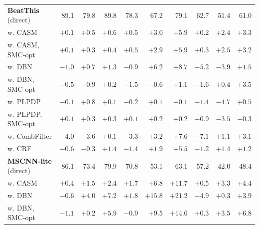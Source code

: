 \documentclass{article}
\begin{document}
\begin{table}[t]
{\begin{tabular}{l|rrr|rrr|rrr}
\textbf{BeatThis} (direct) \cite{foscarin2024beat}
& 89.1 & 79.8 & 89.8
& 78.3 & 67.2 & 79.1
& 62.7 & 51.4 & 61.0 \\
\rowcolor{gray!10}
\quad w. CASM
& $\mathbf{+0.1}$ & $+0.5$ & $+0.6$
& $\mathbf{+0.5}$ & $+3.0$ & $+5.9$
& $+0.2$ & $+2.4$ & $+3.3$ \\
\quad w. CASM, SMC-opt
& $\mathbf{+0.1}$ & $+0.3$ & $+0.4$
& $\mathbf{+0.5}$ & $+2.9$ & $+5.9$
& $\mathbf{+0.3}$ & $\mathbf{+2.5}$ & $+3.2$ \\
\rowcolor{gray!10}
\quad w. DBN \cite{krebs2015dbn}
& $-1.0$ & $+0.7$ & $+1.3$
& $-0.9$ & $\mathbf{+6.2}$ & $\mathbf{+8.7}$
& $-5.2$ & $-3.9$ & $+1.5$ \\
\quad w. DBN, SMC-opt
& $-0.5$ & $-0.9$ & $+0.2$
& $-1.5$ & $-0.6$ & $+1.1$
& $-1.6$ & $+0.4$ & $\mathbf{+3.5}$ \\
\rowcolor{gray!10}
\quad w. PLPDP \cite{chiu2023localperiodicity}
& $-0.1$ & $\mathbf{+0.8}$ & $+0.1$
& $-0.2$ & $+0.1$ & $-0.1$
& $-1.4$ & $-4.7$ & $+0.5$ \\
\quad w. PLPDP, SMC-opt
& $\mathbf{+0.1}$ & $+0.3$ & $+0.3$
& $+0.1$ & $+0.2$ & $+0.2$
& $-0.9$ & $-3.5$ & $-0.3$ \\
\rowcolor{gray!10}
\quad w. CombFilter \cite{bock2015combfilter}
& $-4.0$ & $-3.6$ & $+0.1$
& $-3.3$ & $+3.2$ & $+7.6$
& $-7.1$ & $+1.1$ & $+3.1$ \\
\quad w. CRF \cite{korzeniowski2014crf}
& $-0.6$ & $-0.3$ & $\mathbf{+1.4}$
& $-1.4$ & $+1.9$ & $+5.5$
& $-1.2$ & $+1.4$ & $+1.2$ \\
\midrule
\textbf{MSCNN-lite} (direct) \cite{he2026dynest}
& 86.1 & 73.4 & 79.9
& 70.8 & 53.1 & 63.1
& 57.2 & 42.0 & 48.4 \\
\rowcolor{gray!10}
\quad w. CASM
& $\mathbf{+0.4}$ & $+1.5$ & $+2.4$
& $+1.7$ & $+6.8$ & $+11.7$
& $\mathbf{+0.5}$ & $+3.3$ & $+4.4$ \\
\quad w. DBN
& $-0.6$ & $\mathbf{+4.0}$ & $\mathbf{+7.2}$
& $\mathbf{+1.8}$ & $\mathbf{+15.8}$ & $\mathbf{+21.2}$
& $-4.9$ & $+0.3$ & $+3.9$ \\
\rowcolor{gray!10}
\quad w. DBN, SMC-opt
& $-1.1$ & $+0.2$ & $+5.9$
& $-0.9$ & $+9.5$ & $+14.6$
& $+0.3$ & $\mathbf{+3.5}$ & $\mathbf{+6.8}$ \\


\end{tabular}}
\end{table}
\end{document}
